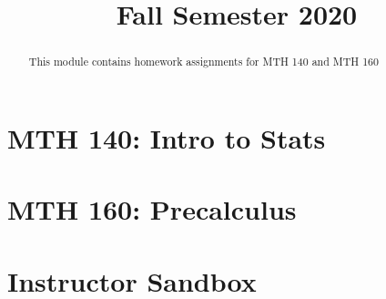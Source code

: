 \documentclass{xourse}
\title{Fall Semester 2020}
\begin{document}
  
\begin{abstract} %
This module contains homework assignments for MTH 140 and MTH 160
\end{abstract}  
\maketitle  
\part{MTH 140: Intro to Stats} 


\part{MTH 160: Precalculus}

\part{Instructor Sandbox}



 
\end{document}
